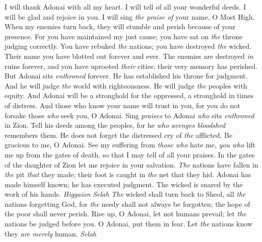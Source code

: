 \begin{biblechapter} %
 I will thank Adonai with all my heart. 
I will tell of all your wonderful deeds.
\verse I will be glad and rejoice in you. 
I will sing \textit{the praise of} your name, O Most High.
\verse When my enemies turn back, 
they will stumble and perish because of your presence.
\verse For you have maintained my just cause; 
you have sat on \textit{the} throne judging correctly.
\verse You have rebuked \textit{the} nations; 
you have destroyed \textit{the} wicked. 
Their name you have blotted out 
forever and ever.
\verse The enemies are destroyed \textit{in} ruins forever, 
and you have uprooted \textit{their} cities; 
their very memory has perished.
\verse But Adonai sits \textit{enthroned} forever. 
He has established his throne for judgment.
\verse And he will judge \textit{the} world with righteousness. 
He will judge \textit{the} peoples with equity.
\verse And Adonai will be a stronghold for the oppressed, 
a stronghold in times of distress.
\verse And those who know your name will trust in you, 
for you do not forsake those \textit{who} seek you, O Adonai.
\verse Sing \textit{praises} to Adonai \textit{who} sits \textit{enthroned} in Zion. 
Tell his deeds among the peoples,
\verse for he \textit{who} \textit{avenges bloodshed} remembers them. 
He does not forget the distressed cry of \textit{the} afflicted.
\verse Be gracious to me, O Adonai. 
See my suffering from \textit{those who} hate me, 
\textit{you who} lift me up from the gates of death,
\verse so that I may tell of all your praises. 
In the gates of the daughter of Zion 
let me rejoice in your salvation.
\verse \textit{The} nations have fallen in \textit{the} pit \textit{that} they made; 
their foot is caught in \textit{the} net that they hid.
\verse Adonai has made himself known; 
he has executed judgment. 
The wicked is snared by the work of his hands. \textit{Higgaion} \textit{Selah}
\verse \textit{The} wicked shall turn back to Sheol, 
all \textit{the} nations forgetting God,
\verse for \textit{the} needy shall not always be forgotten; 
the hope of the poor shall never perish.
\verse Rise up, O Adonai, let not humans prevail; 
let \textit{the} nations be judged before you.
\verse O Adonai, put them in fear. 
Let \textit{the} nations know they \textit{are merely} human. \textit{Selah}
\end{biblechapter}

